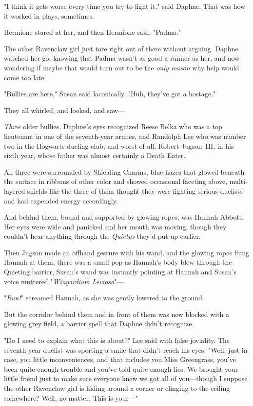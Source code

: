 "I think it gets worse every time you try to fight it," said Daphne. That was
how it worked in plays, sometimes.

Hermione stared at her, and then Hermione said, "Padma."

The other Ravenclaw girl just tore right out of there without arguing. Daphne
watched her go, knowing that Padma wasn't as good a runner as her, and now
wondering if maybe that would turn out to be the \emph{only reason} why help
would come too late{\el}

"Bullies are here," Susan said laconically. "Huh, they've got a hostage."

They all whirled, and looked, and saw---

\emph{Three} older bullies, Daphne's eyes recognized Reese Belka who was a top
lieutenant in one of the seventh-year armies, and Randolph Lee who was number
two in the Hogwarts dueling club, and worst of all, Robert Jugson~III, in his
sixth year, whose father was almost certainly a Death Eater.

All three were surrounded by Shielding Charms, blue hazes that glowed beneath
the surface in ribbons of other color and showed occasional faceting above,
multi-layered shields like the three of them thought they were fighting serious
duelists and had expended energy accordingly.

And behind them, bound and supported by glowing ropes, was Hannah Abbott. Her
eyes were wide and panicked and her mouth was moving, though they couldn't hear
anything through the \emph{Quietus} they'd put up earlier.

Then Jugson made an offhand gesture with his wand, and the glowing ropes flung
Hannah at them, there was a small pop as Hannah's body blew through the
Quieting barrier, Susan's wand was instantly pointing at Hannah and Susan's
voice muttered "\emph{Wingardium Leviosa}"---

"\emph{Run!}" screamed Hannah, as she was gently lowered to the ground.

But the corridor behind them and in front of them was now blocked with a
glowing grey field, a barrier spell that Daphne didn't recognize.

"Do I need to explain what this is about?" Lee said with false joviality. The
seventh-year duelist was sporting a smile that didn't reach his eyes. "Well,
just in case, you little inconveniences, and that includes you Miss Greengrass,
you've been quite enough trouble and you've told quite enough lies. We brought
your little friend just to make sure everyone knew we got all of you---though I
suppose the other Ravenclaw girl is hiding around a corner or clinging to the
ceiling somewhere? Well, no matter. This is your\mbox{---}"

